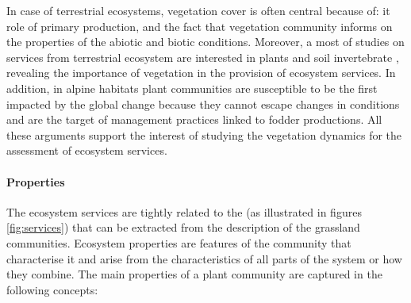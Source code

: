 In case of terrestrial ecosystems, vegetation cover is often central because of: it role of primary production, and the fact that vegetation community informs on the properties of the abiotic and biotic conditions. Moreover, a most of studies on services from terrestrial ecosystem are interested in plants and soil invertebrate \cite{de_bello_towards_2010}, revealing the importance of vegetation in the provision of ecosystem services. In addition, in alpine habitats plant communities are susceptible to be the first impacted by the global change because they cannot escape changes in conditions and are the target of management practices linked to fodder productions. All these arguments support the interest of studying the vegetation dynamics for the assessment of ecosystem services.


\paragraph{Properties}
The ecosystem services are tightly related to the  (as illustrated in figures \ref{fig:services})\parencite{lavorel_predicting_2002, diaz_incorporating_2007} that can be extracted from the description of the grassland communities. Ecosystem properties are features of the community that characterise it and arise from the characteristics of all parts of the system or how they combine. The main properties of a plant community are captured in the following concepts:
